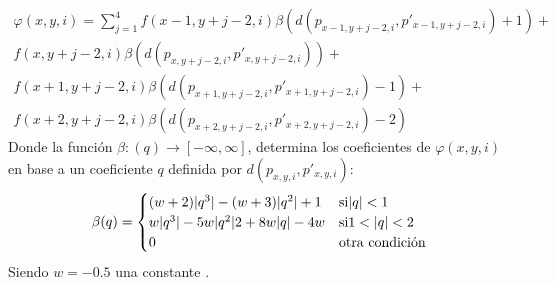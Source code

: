 \begin{itemize}
\begin{align}
										\varphi(x,y,i) = \sum_{j=1}^{4} f(x-1,y+j-2,i)\beta(d(p_{x-1,y+j-2,i},p'_{x-1,y+j-2,i})+1)+ \nonumber \\
										f(x,y+j-2,i)\beta(d(p_{x,y+j-2,i},p'_{x,y+j-2,i}))+ \nonumber \\
										f(x+1,y+j-2,i)\beta(d(p_{x+1,y+j-2,i},p'_{x+1,y+j-2,i})-1)+ \nonumber \\
										f(x+2,y+j-2,i)\beta(d(p_{x+2,y+j-2,i},p'_{x+2,y+j-2,i})-2)
										\end{align}
					Donde la funci\'on $ \beta:(q) \longrightarrow [-\infty,\infty] $, determina los coeficientes de $ \varphi(x,y,i) $ en base a un coeficiente $ q $ definida por $ d(p_{x,y,i},p'_{x,y,i}) $:
		    		\begin{equation}\label{ec:interCubica}
		    		\beta(q) = \begin{cases}
		    		(w+2)\abs{q^{3}}-(w+3)\abs{q^{2}}+1 & \text{si} \abs{q} < 1 \\
		    		w\abs{q^{3}}-5w\abs{q^{2}}2+8w\abs{q}-4w & \text{si} 1 < \abs{q} < 2\\
		    		0 & \text{otra condici\'on}
		    		\end{cases}
		    		\end{equation}
		    		Siendo $ w=-0.5 $ una constante \cite{guide1999erdas}.\\~\\

	\end{itemize}
